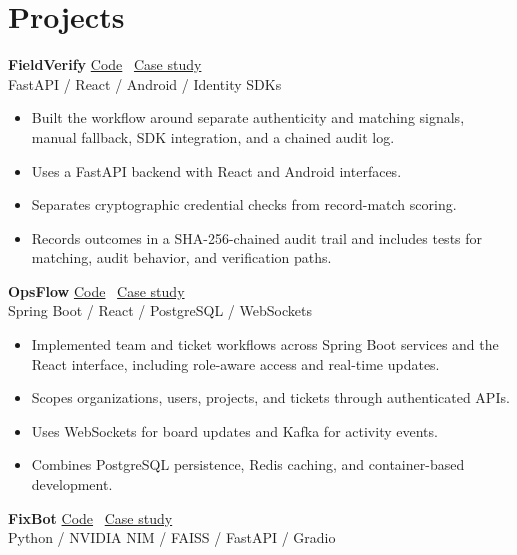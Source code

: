 \documentclass[11pt,letterpaper]{article}
\begin{document}
\section*{Projects}
\textbf{FieldVerify}\hfill{\small{} \href{https://github.com/PratheekEranki/fieldverify}{Code} \textbar\ \href{https://pratheekeranki.github.io/portfolio/\#project/fieldverify}{Case study}}\\
{\small{}FastAPI / React / Android / Identity SDKs}\par
\begin{itemize}
\item Built the workflow around separate authenticity and matching signals, manual fallback, SDK integration, and a chained audit log.
\item Uses a FastAPI backend with React and Android interfaces.
\item Separates cryptographic credential checks from record-match scoring.
\item Records outcomes in a SHA-256-chained audit trail and includes tests for matching, audit behavior, and verification paths.
\end{itemize}\vspace{3pt}
\textbf{OpsFlow}\hfill{\small{} \href{https://github.com/PratheekEranki/opsflow-saas}{Code} \textbar\ \href{https://pratheekeranki.github.io/portfolio/\#project/opsflow}{Case study}}\\
{\small{}Spring Boot / React / PostgreSQL / WebSockets}\par
\begin{itemize}
\item Implemented team and ticket workflows across Spring Boot services and the React interface, including role-aware access and real-time updates.
\item Scopes organizations, users, projects, and tickets through authenticated APIs.
\item Uses WebSockets for board updates and Kafka for activity events.
\item Combines PostgreSQL persistence, Redis caching, and container-based development.
\end{itemize}\vspace{3pt}
\textbf{FixBot}\hfill{\small{} \href{https://github.com/PratheekEranki/fixbot-device-agent}{Code} \textbar\ \href{https://pratheekeranki.github.io/portfolio/\#project/fixbot}{Case study}}\\
{\small{}Python / NVIDIA NIM / FAISS / FastAPI / Gradio}\par
\end{document}
